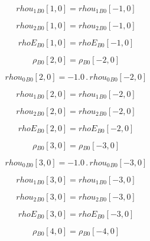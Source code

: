 \documentclass{article}
\begin{document}
\begin{dmath}{rhou_{1}{_{B0}}}[{1,0}] = {rhou_{1}{_{B0}}}[{-1,0}]\end{dmath}

\begin{dmath}{rhou_{2}{_{B0}}}[{1,0}] = {rhou_{2}{_{B0}}}[{-1,0}]\end{dmath}

\begin{dmath}{rhoE{_{B0}}}[{1,0}] = {rhoE{_{B0}}}[{-1,0}]\end{dmath}

\begin{dmath}{\rho{_{B0}}}[{2,0}] = {\rho{_{B0}}}[{-2,0}]\end{dmath}

\begin{dmath}{rhou_{0}{_{B0}}}[{2,0}] = - 1.0 \,.\, {rhou_{0}{_{B0}}}[{-2,0}]\end{dmath}

\begin{dmath}{rhou_{1}{_{B0}}}[{2,0}] = {rhou_{1}{_{B0}}}[{-2,0}]\end{dmath}

\begin{dmath}{rhou_{2}{_{B0}}}[{2,0}] = {rhou_{2}{_{B0}}}[{-2,0}]\end{dmath}

\begin{dmath}{rhoE{_{B0}}}[{2,0}] = {rhoE{_{B0}}}[{-2,0}]\end{dmath}

\begin{dmath}{\rho{_{B0}}}[{3,0}] = {\rho{_{B0}}}[{-3,0}]\end{dmath}

\begin{dmath}{rhou_{0}{_{B0}}}[{3,0}] = - 1.0 \,.\, {rhou_{0}{_{B0}}}[{-3,0}]\end{dmath}

\begin{dmath}{rhou_{1}{_{B0}}}[{3,0}] = {rhou_{1}{_{B0}}}[{-3,0}]\end{dmath}

\begin{dmath}{rhou_{2}{_{B0}}}[{3,0}] = {rhou_{2}{_{B0}}}[{-3,0}]\end{dmath}

\begin{dmath}{rhoE{_{B0}}}[{3,0}] = {rhoE{_{B0}}}[{-3,0}]\end{dmath}

\begin{dmath}{\rho{_{B0}}}[{4,0}] = {\rho{_{B0}}}[{-4,0}]\end{dmath}
\end{document}
